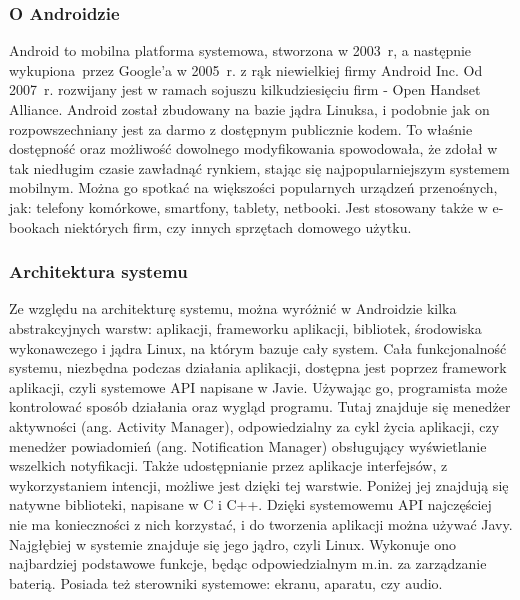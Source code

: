 \subsubsection*{O Androidzie}

Android to mobilna platforma systemowa, stworzona w 2003~r, a następnie wykupiona przez Google'a w 2005~r. z rąk niewielkiej firmy Android Inc. Od 2007~r. rozwijany jest w ramach sojuszu kilkudziesięciu firm - Open Handset Alliance. Android został zbudowany na bazie jądra Linuksa, i podobnie jak on rozpowszechniany jest za darmo z dostępnym publicznie kodem. To właśnie dostępność oraz możliwość dowolnego modyfikowania spowodowała, że zdołał w tak niedługim czasie zawładnąć rynkiem, stając się najpopularniejszym systemem mobilnym. Można go spotkać na większości popularnych urządzeń przenośnych, jak: telefony komórkowe, smartfony, tablety, netbooki. Jest stosowany także w e-bookach niektórych firm, czy innych sprzętach domowego użytku. 


\subsubsection*{Architektura systemu}
Ze względu na architekturę systemu, można wyróżnić w Androidzie kilka abstrakcyjnych warstw: aplikacji, frameworku aplikacji, bibliotek, środowiska wykonawczego i jądra Linux, na którym bazuje cały system. Cała funkcjonalność systemu, niezbędna podczas działania aplikacji, dostępna jest poprzez framework aplikacji, czyli systemowe API napisane w Javie. Używając go, programista może kontrolować sposób działania oraz wygląd programu. Tutaj znajduje się menedżer aktywności (ang. Activity Manager), odpowiedzialny za cykl życia aplikacji, czy menedżer powiadomień (ang. Notification Manager) obsługujący wyświetlanie wszelkich notyfikacji. Także udostępnianie przez aplikacje interfejsów, z wykorzystaniem intencji, możliwe jest dzięki tej warstwie. Poniżej jej znajdują się natywne biblioteki, napisane w C i C++. Dzięki systemowemu API najczęściej nie ma konieczności z nich korzystać, i do tworzenia aplikacji można używać Javy. Najgłębiej w systemie znajduje się jego jądro, czyli Linux. Wykonuje ono najbardziej podstawowe funkcje, będąc odpowiedzialnym m.in. za zarządzanie baterią. Posiada też sterowniki systemowe: ekranu, aparatu, czy audio.

